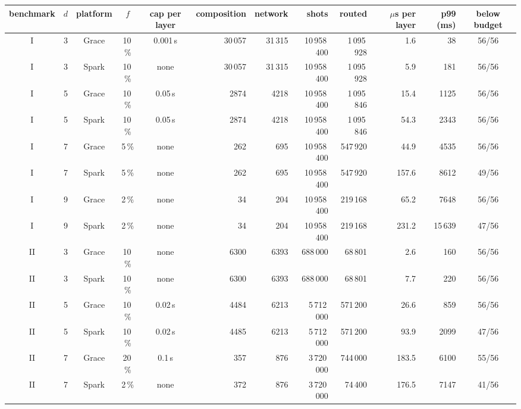 \begin{tabular}{@{}cccccrrrrrrc@{}}
\toprule
benchmark & $d$ & platform & $f$ & cap per layer & composition & network & shots & routed & $\mu$s per layer & p99 (ms) & below budget \\
\midrule
I & 3 & Grace & 10\,\% & 0.001\,s & 30\,057 & 31\,315 & 10\,958\,400 & 1\,095\,928 & 1.6 & 38 & 56/56 \\
I & 3 & Spark & 10\,\% & none & 30\,057 & 31\,315 & 10\,958\,400 & 1\,095\,928 & 5.9 & 181 & 56/56 \\
I & 5 & Grace & 10\,\% & 0.05\,s & 2874 & 4218 & 10\,958\,400 & 1\,095\,846 & 15.4 & 1125 & 56/56 \\
I & 5 & Spark & 10\,\% & 0.05\,s & 2874 & 4218 & 10\,958\,400 & 1\,095\,846 & 54.3 & 2343 & 56/56 \\
I & 7 & Grace & 5\,\% & none & 262 & 695 & 10\,958\,400 & 547\,920 & 44.9 & 4535 & 56/56 \\
I & 7 & Spark & 5\,\% & none & 262 & 695 & 10\,958\,400 & 547\,920 & 157.6 & 8612 & 49/56 \\
I & 9 & Grace & 2\,\% & none & 34 & 204 & 10\,958\,400 & 219\,168 & 65.2 & 7648 & 56/56 \\
I & 9 & Spark & 2\,\% & none & 34 & 204 & 10\,958\,400 & 219\,168 & 231.2 & 15\,639 & 47/56 \\
II & 3 & Grace & 10\,\% & none & 6300 & 6393 & 688\,000 & 68\,801 & 2.6 & 160 & 56/56 \\
II & 3 & Spark & 10\,\% & none & 6300 & 6393 & 688\,000 & 68\,801 & 7.7 & 220 & 56/56 \\
II & 5 & Grace & 10\,\% & 0.02\,s & 4484 & 6213 & 5\,712\,000 & 571\,200 & 26.6 & 859 & 56/56 \\
II & 5 & Spark & 10\,\% & 0.02\,s & 4485 & 6213 & 5\,712\,000 & 571\,200 & 93.9 & 2099 & 47/56 \\
II & 7 & Grace & 20\,\% & 0.1\,s & 357 & 876 & 3\,720\,000 & 744\,000 & 183.5 & 6100 & 55/56 \\
II & 7 & Spark & 2\,\% & none & 372 & 876 & 3\,720\,000 & 74\,400 & 176.5 & 7147 & 41/56 \\
\bottomrule
\end{tabular}

